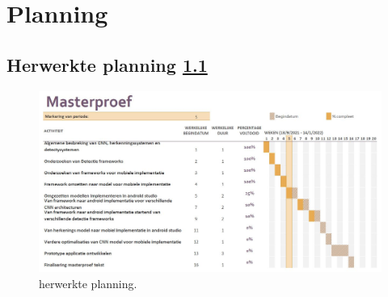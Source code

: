 \chapter{Planning}
\section{Herwerkte planning \ref{fig:plan}}
\begin{figure}[!ht]
	\centering
	\includegraphics[width=1.0\linewidth]{fig/planning.jpg}
	\caption{herwerkte planning.}
	\label{fig:plan}
\end{figure}